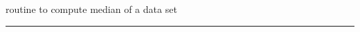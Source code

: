 
\begin{related}
  \begin{sulist}{} %
  \item[\htmlref{median}{sub:median}] routine to compute median of a data set
  \end{sulist}
\end{related}

\rule{\hsize}{2mm}

\newpage
